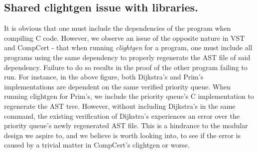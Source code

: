 \subsection{Shared clightgen issue with libraries.} It is obvious that one must include the dependencies of the program when compiling C code. However, we observe an issue of the opposite nature in VST and CompCert - that when running \textit{clightgen} for a program, one must include all programs using the same dependency to properly regenerate the AST file of said dependency. Failure to do so results in the proof of the other program failing to run.
\newline\newline
For instance, in the above figure, both Dijkstra's and Prim's implementations are dependent on the same verified priority queue. When running clightgen for Prim's, we include the priority queue's C implementation to regenerate the AST tree. However, without including Dijkstra's in the same command, the existing verification of Dijkstra's experiences an error over the priority queue's newly regenerated AST file.
\newline\newline
This is a hindrance to the modular design we aspire to, and we believe is worth looking into, to see if the error is caused by a trivial matter in CompCert's clightgen or worse.